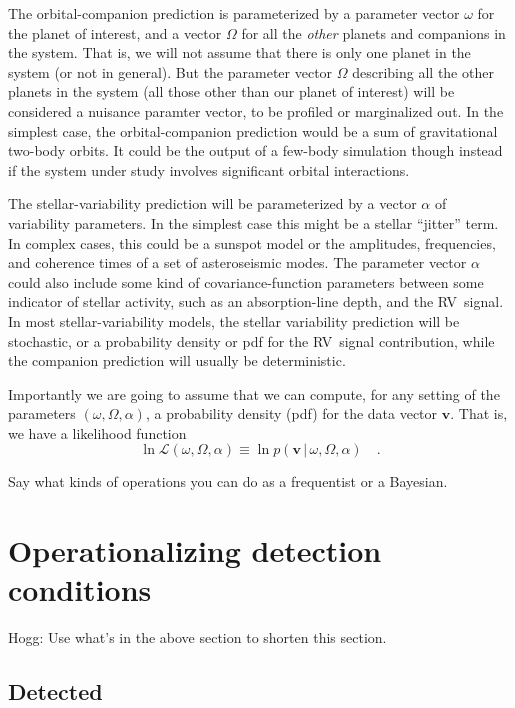 \documentclass[modern]{aastex63}
\newcommand{\acronym}[1]{{\small{#1}}}
\newcommand{\rv}{\acronym{RV}}
\newcommand{\given}{\,|\,}
\renewcommand{\vector}[1]{\boldsymbol{#1}}
\newcommand{\like}{\mathscr{L}}
\newcommand{\lnlike}{\ln\like}
\newcommand{\vv}{\vector{v}}
\begin{document}
The orbital-companion prediction is parameterized by a parameter
vector $\omega$ for the planet of interest, and a vector $\Omega$ for
all the \emph{other} planets and companions in the system.
That is, we will not assume that there is only one planet in the
system (or not in general).
But the parameter vector $\Omega$ describing all the other planets in
the system (all those other than our planet of interest) will be
considered a nuisance paramter vector, to be profiled or marginalized
out.
In the simplest case, the orbital-companion prediction would be a sum
of gravitational two-body orbits.
It could be the output of a few-body simulation though instead if the
system under study involves significant orbital interactions.

The stellar-variability prediction will be parameterized by a vector
$\alpha$ of variability parameters.
In the simplest case this might be a stellar ``jitter'' term.
In complex cases, this could be a sunspot model or the amplitudes,
frequencies, and coherence times of a set of asteroseismic modes.
The parameter vector $\alpha$ could also include some kind of
covariance-function parameters between some indicator of stellar
activity, such as an absorption-line depth, and the \rv\ signal.
In most stellar-variability models, the stellar variability prediction
will be stochastic, or a probability density or pdf for the \rv\
signal contribution, while the companion prediction will usually be
deterministic.

Importantly we are going to assume that we can compute, for any setting
of the parameters $(\omega, \Omega, \alpha)$, a probability density
(pdf) for the data vector $\vv$. That is, we have a likelihood function
\begin{equation}
\lnlike(\omega,\Omega,\alpha) \equiv \ln p(\vv\given\omega,\Omega,\alpha)
\quad .
\end{equation}

Say what kinds of operations you can do as a frequentist or a Bayesian.

\section{Operationalizing detection conditions}

Hogg: Use what's in the above section to shorten this section.

\subsection{Detected}
\end{document}
